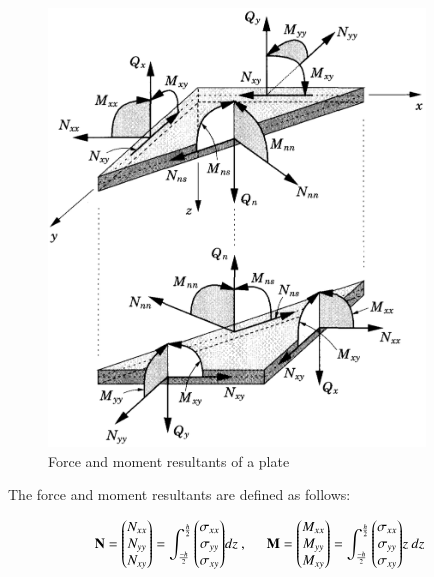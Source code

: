 \begin{figure}[H]
	\centering
	\includegraphics[width=10cm]{images/composite_force_resultants}
	\caption{Force and moment resultants of a plate \cite{reddy2004mechanics}}
	\label{fig:compositeforceresultants}
\end{figure}

The force and moment resultants are defined as follows:

\begin{equation} 
\mathbf{N} = 
\begin{pmatrix}
N_{xx} \\
N_{yy} \\
N_{xy} 
\end{pmatrix}
=
{\int_{\frac{-h}{2}}^{\frac{h}{2}}
\begin{pmatrix}
\sigma_{xx} \\
\sigma_{yy} \\
\sigma_{xy} 
\end{pmatrix}}
dz\ ,
\hspace{5mm}
\mathbf{M} = 
\begin{pmatrix}
M_{xx} \\
M_{yy} \\
M_{xy} 
\end{pmatrix}
=
{\int_{\frac{-h}{2}}^{\frac{h}{2}}
	\begin{pmatrix}
	\sigma_{xx} \\
	\sigma_{yy} \\
	\sigma_{xy} 
	\end{pmatrix}}z\ 
dz
\label{eqscomp_force_resultants}
\end{equation}

